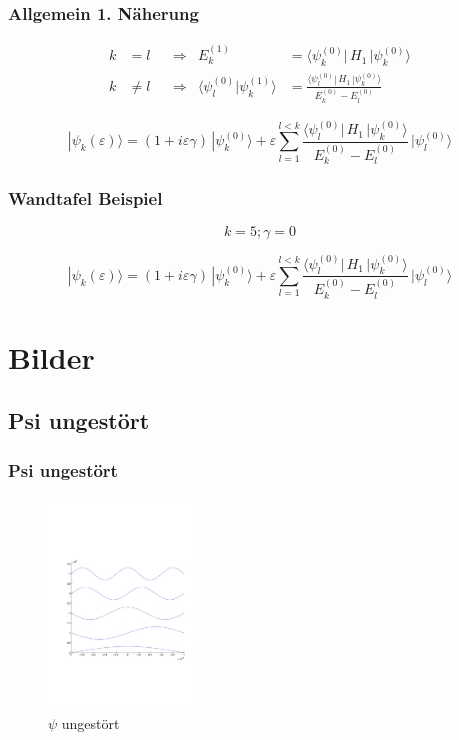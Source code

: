 \documentclass[aspectratio=169]{beamer}
\begin{document}
\begin{frame}
  \frametitle{ Allgemein 1. N\"aherung }
  
  \[
      \begin{aligned}
      k&=l
      &&\Rightarrow&
      E_k^{(1)}
      &=
      \langle \psi_k^{(0)}|\, H_1 \,|\psi_k^{(0)}\rangle
      \\
      k&\ne l
      &&\Rightarrow&
      \langle\psi_l^{(0)}|\psi_k^{(1)}\rangle
      &=
      \frac{\langle \psi_l^{(0)}|\, H_1 \,|\psi_k^{(0)}\rangle}{E_k^{(0)}-E_l^{(0)}}
    \end{aligned}
  \]
  
  \[
    |\psi_k(\varepsilon)\rangle
    =
    (1+i\varepsilon \gamma)
    \,|\psi_k^{(0)}\rangle
    +
    \varepsilon
    \sum_{l=1}^{ l < k }
    \frac{\langle \psi_l^{(0)}|\, H_1 \,|\psi_k^{(0)}\rangle}{E_k^{(0)}-E_l^{(0)}}
    \,
    |\psi_l^{(0)}\rangle
  \]
  
\end{frame}


\begin{frame}
  \frametitle{ Wandtafel Beispiel }
  
  \[
    k = 5 ; \gamma = 0
  \]
  
  \[
    |\psi_k(\varepsilon)\rangle
    =
    (1+i\varepsilon \gamma)
    \,|\psi_k^{(0)}\rangle
    +
    \varepsilon
    \sum_{l=1}^{ l < k }
    \frac{\langle \psi_l^{(0)}|\, H_1 \,|\psi_k^{(0)}\rangle}{E_k^{(0)}-E_l^{(0)}}
    \,
    |\psi_l^{(0)}\rangle
  \]
  
\end{frame}



\section{ Bilder }
\subsection{ Psi ungest\"ort }
\begin{frame}
  \frametitle{ Psi ungest\"ort }
  \begin{figure}
    \centering
    \includegraphics[height=5.6cm,clip=true,trim=2cm 7cm 1cm 8cm]{../../skript/efeld/Psi_ungestoert.pdf}
    \caption{$\psi$ ungest\"ort}
    \label{abb:efeld_psi_ungestoert}
  \end{figure}

\end{frame}
\end{document}

